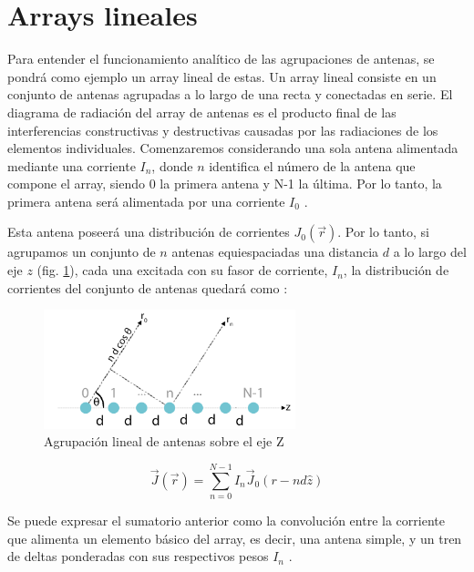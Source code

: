\section{Arrays lineales}
\par Para entender el funcionamiento analítico de las agrupaciones de antenas, se pondrá como ejemplo un array lineal de estas. Un array lineal consiste en un conjunto de antenas agrupadas a lo largo de una recta y conectadas en serie. El diagrama de radiación del array de antenas es el producto final de las interferencias constructivas y destructivas causadas por las radiaciones de los elementos individuales. Comenzaremos considerando una sola antena alimentada mediante una corriente $I_{n}$, donde $n$ identifica el número de la antena que compone el array, siendo 0 la primera antena y N-1 la última. Por lo tanto, la primera antena será alimentada por una corriente $I_{0}$ \citep{Cardama2002}.
\\
\par Esta antena poseerá una distribución de corrientes $J_{0}(\vec{r})$. Por lo tanto, si agrupamos un conjunto de $n$ antenas equiespaciadas una distancia $d$ a lo largo del eje $z$ (fig. \ref{fig:arraigo}), cada una excitada con su fasor de corriente, $I_{n}$, la distribución de corrientes del conjunto de antenas quedará como \cite{Cardama2002}:

\begin{figure}[h]
    \centering
        \includegraphics[width=0.65\textwidth]{archivos/array/array}
        \caption{Agrupación lineal de antenas sobre el eje Z}
        \label{fig:arraigo}
\end{figure}

\begin{equation}
	\vec{J}\left ( \vec{r} \right )=\sum_{n=0}^{N-1}I_{n}\vec{J}_{0}(r-nd\hat{z})
	\label{eq:distrib}
\end{equation}

\par Se puede expresar el sumatorio anterior como la convolución entre la corriente que alimenta un elemento básico del array, es decir, una antena simple, y un tren de deltas ponderadas con sus respectivos pesos $I_{n}$ \cite{Cardama2002}.

